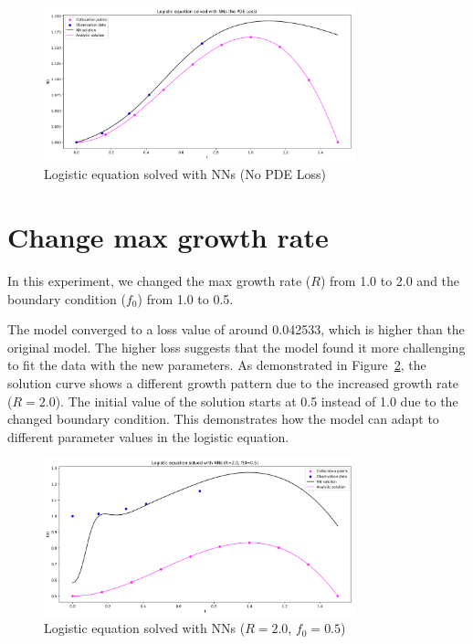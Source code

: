 \documentclass[11pt,a4paper]{article}
\begin{document}
\begin{figure}[h]
    \centering
    \includegraphics[width=0.8\textwidth]{figures/pinn_task2_no_pde.png}
    \caption{Logistic equation solved with NNs (No PDE Loss)}
    \label{fig:no_pde}
\end{figure}

\section{Change max growth rate}
In this experiment, we changed the max growth rate ($R$) from 1.0 to 2.0 and the boundary condition ($f_0$) from 1.0 to 0.5.

The model converged to a loss value of around 0.042533, which is higher than the original model. The higher loss suggests that the model found it more challenging to fit the data with the new parameters. As demonstrated in Figure~\ref{fig:changed_params}, the solution curve shows a different growth pattern due to the increased growth rate ($R=2.0$). The initial value of the solution starts at 0.5 instead of 1.0 due to the changed boundary condition. This demonstrates how the model can adapt to different parameter values in the logistic equation.

\begin{figure}[h]
    \centering
    \includegraphics[width=0.8\textwidth]{figures/pinn_task3_changed_params.png}
    \caption{Logistic equation solved with NNs ($R=2.0$, $f_0=0.5$)}
    \label{fig:changed_params}
\end{figure}
\end{document}
